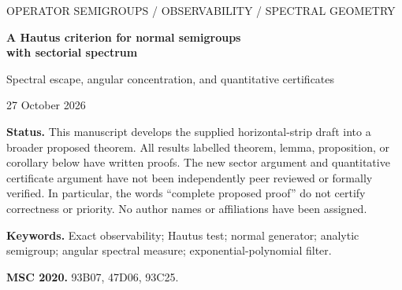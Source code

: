 \documentclass[11pt,a4paper]{article}
\theoremstyle{definition}\newtheorem{definition}[theorem]{Definition}
\theoremstyle{remark}\newtheorem{remark}[theorem]{Remark}
\begin{document}
\begin{center}
{\small OPERATOR SEMIGROUPS / OBSERVABILITY / SPECTRAL GEOMETRY}\par\vspace{10pt}
{\LARGE\bfseries A Hautus criterion for normal semigroups\\[3pt] with sectorial spectrum}\par\vspace{8pt}
{\large Spectral escape, angular concentration, and quantitative certificates}\par\vspace{8pt}
27 October 2026
\end{center}
\noindent\textbf{Status.} This manuscript develops the supplied horizontal-strip draft into a broader proposed theorem. All results labelled theorem, lemma, proposition, or corollary below have written proofs. The new sector argument and quantitative certificate argument have not been independently peer reviewed or formally verified. In particular, the words ``complete proposed proof'' do not certify correctness or priority. No author names or affiliations have been assigned.
\begin{abstract}
Let $A$ be an exponentially stable normal semigroup generator on a complex Hilbert space, and suppose that $\sigma(A)$ lies in a sector strictly inside the left half-plane. For a graph-norm bounded, $L^2$-admissible observation operator with arbitrary Hilbert output, we prove that the quantitative Hautus condition implies infinite-time exact observability. The argument reduces the problem to a probability measure on the compact interval of spectral slopes. Polynomial-exponential filters concentrate simultaneously in scale and at an extreme slope; finite differences realize the filters using only positive real semigroup times. This replaces the vanishing-angle step of the supplied horizontal-strip argument. We also prove a separate spectral escape theorem under a nonuniform pointwise separation hypothesis, derive finite computable certificates for observability constants, give an explicit narrow-sector estimate, and examine continuous-spectrum examples with nontrivial output cancellation. The general lower bound is certified through a finite scalar filter family, not through an optimal closed-form formula.
\end{abstract}
\noindent\textbf{Keywords.} Exact observability; Hautus test; normal generator; analytic semigroup; angular spectral measure; exponential-polynomial filter.\par
\noindent\textbf{MSC 2020.} 93B07, 47D06, 93C25.
\tableofcontents
\end{document}
